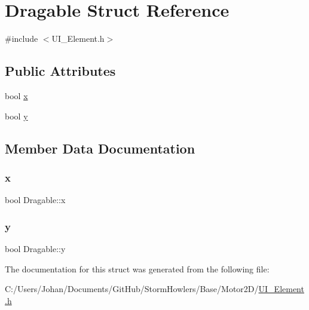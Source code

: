\hypertarget{struct_dragable}{}\section{Dragable Struct Reference}
\label{struct_dragable}


{\ttfamily \#include $<$U\+I\+\_\+\+Element.\+h$>$}

\subsection*{Public Attributes}
\begin{DoxyCompactItemize}
\item 
bool \mbox{\hyperlink{struct_dragable_af03d9f6c2072519470e89769e7ffdaeb}{x}}
\item 
bool \mbox{\hyperlink{struct_dragable_a2b5d10e5606550f5b8c067aaeaeb887a}{y}}
\end{DoxyCompactItemize}


\subsection{Member Data Documentation}
\mbox{\label{struct_dragable_af03d9f6c2072519470e89769e7ffdaeb}} 
\subsubsection{\texorpdfstring{x}{x}}
{\footnotesize\ttfamily bool Dragable\+::x}

\mbox{\label{struct_dragable_a2b5d10e5606550f5b8c067aaeaeb887a}} 
\subsubsection{\texorpdfstring{y}{y}}
{\footnotesize\ttfamily bool Dragable\+::y}



The documentation for this struct was generated from the following file\+:\begin{DoxyCompactItemize}
\item 
C\+:/\+Users/\+Johan/\+Documents/\+Git\+Hub/\+Storm\+Howlers/\+Base/\+Motor2\+D/\mbox{\hyperlink{_u_i___element_8h}{U\+I\+\_\+\+Element.\+h}}\end{DoxyCompactItemize}
